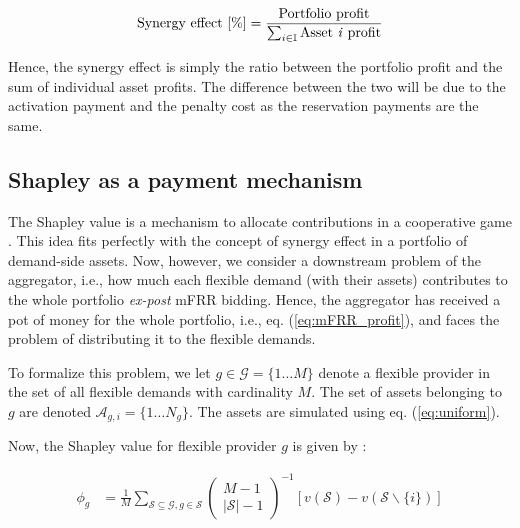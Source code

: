 \documentclass[lettersize,journal]{IEEEtran}
\begin{document}
\begin{align}\label{eq:synergy_effect}
    \text{Synergy effect [\%]} = \frac{ \text{Portfolio profit} }{ \sum_{i \in \mathbb{I}} \text{Asset \textit{i} profit} }
\end{align}

Hence, the synergy effect is simply the ratio between the portfolio profit and the sum of individual asset profits. The difference between the two will be due to the activation payment and the penalty cost as the reservation payments are the same.

\subsection{Shapley as a payment mechanism}

The Shapley value is a mechanism to allocate contributions in a cooperative game \cite{shapley1997value}. This idea fits perfectly with the concept of synergy effect in a portfolio of demand-side assets. Now, however, we consider a downstream problem of the aggregator, i.e., how much each flexible demand (with their assets) contributes to the whole portfolio \textit{ex-post} mFRR bidding. Hence, the aggregator has received a pot of money for the whole portfolio, i.e., eq. (\ref{eq:mFRR_profit}), and faces the problem of distributing it to the flexible demands.

To formalize this problem, we let $g \in \mathcal{G} = \{1 \hdots M \}$ denote a flexible provider in the set of all flexible demands with cardinality $M$. The set of assets belonging to $g$ are denoted $\mathcal{A}_{g,i} = \{1 \hdots N_g \}$. The assets are simulated using eq. (\ref{eq:uniform}).

Now, the Shapley value for flexible provider $g$ is given by \cite{shapley1997value}:

\begin{align}\label{eq:shap}
    \phi_g & = \frac{1}{M} \sum_{\mathcal{S} \subseteq \mathcal{G}, g \in \mathcal{S}}\left(\begin{array}{c}
                                                                                                    M-1 \\
                                                                                                    |\mathcal{S}|-1
                                                                                                \end{array}\right)^{-1}[v(\mathcal{S})-v(\mathcal{S} \backslash\{i\})]
\end{align}
\end{document}
